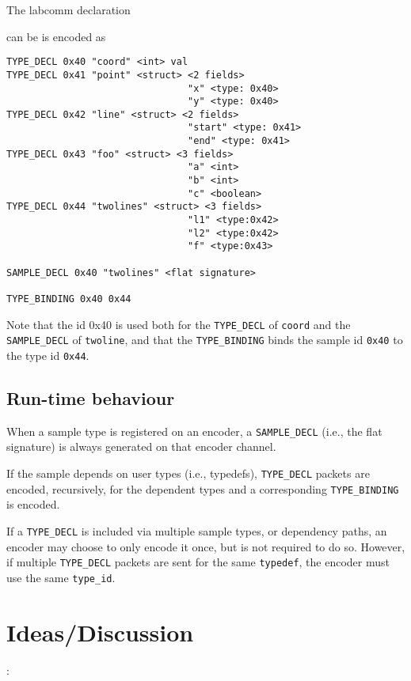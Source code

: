 \documentclass[a4paper]{article}
\begin{document}
The labcomm declaration

can be is encoded as
\begin{lstlisting}[basicstyle=\footnotesize\ttfamily]
TYPE_DECL 0x40 "coord" <int> val
TYPE_DECL 0x41 "point" <struct> <2 fields> 
                                "x" <type: 0x40> 
                                "y" <type: 0x40>
TYPE_DECL 0x42 "line" <struct> <2 fields> 
                                "start" <type: 0x41> 
                                "end" <type: 0x41>
TYPE_DECL 0x43 "foo" <struct> <3 fields> 
                                "a" <int> 
                                "b" <int> 
                                "c" <boolean>
TYPE_DECL 0x44 "twolines" <struct> <3 fields> 
                                "l1" <type:0x42> 
                                "l2" <type:0x42> 
                                "f" <type:0x43>

SAMPLE_DECL 0x40 "twolines" <flat signature>

TYPE_BINDING 0x40 0x44
\end{lstlisting}

Note that the id 0x40 is used both for the \verb+TYPE_DECL+ of
\verb+coord+ and the \verb+SAMPLE_DECL+ of \verb+twoline+, and that the
\verb+TYPE_BINDING+ binds the sample id \verb+0x40+ to the type id
\verb+0x44+.

\subsection{Run-time behaviour}

When a sample type is registered on an encoder, a \verb+SAMPLE_DECL+
(i.e., the flat signature) is always generated on that encoder channel.

If the sample depends on user types (i.e., typedefs), \verb+TYPE_DECL+
packets are encoded, recursively, for the dependent types and a 
corresponding \verb+TYPE_BINDING+ is encoded.

If a \verb+TYPE_DECL+ is included via multiple sample types, or
dependency paths, an encoder may choose to only encode it once, but is
not required to do so. However, if multiple \verb+TYPE_DECL+ packets are
sent for the same \verb+typedef+, the encoder must use the same
\verb+type_id+.



\section{Ideas/Discussion}:
\end{document}

